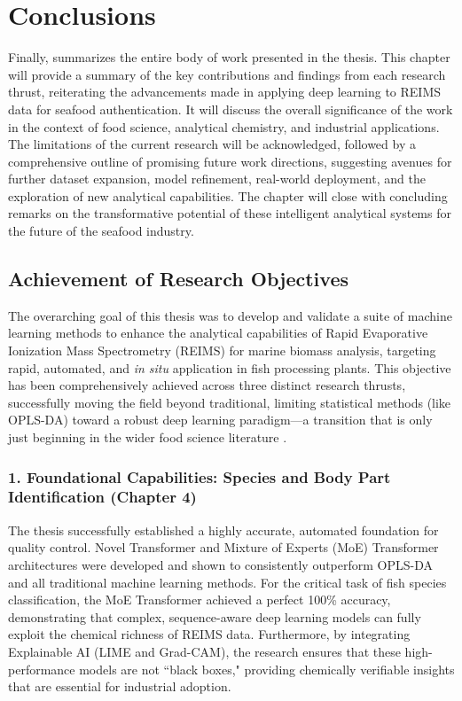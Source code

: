 \chapter{Conclusions}
\label{chapter:conclusions}

Finally,  summarizes the entire body of work presented in the thesis. This chapter will provide a summary of the key contributions and findings from each research thrust, reiterating the advancements made in applying deep learning to REIMS data for seafood authentication. It will discuss the overall significance of the work in the context of food science, analytical chemistry, and industrial applications. The limitations of the current research will be acknowledged, followed by a comprehensive outline of promising future work directions, suggesting avenues for further dataset expansion, model refinement, real-world deployment, and the exploration of new analytical capabilities. The chapter will close with concluding remarks on the transformative potential of these intelligent analytical systems for the future of the seafood industry.

\section{Achievement of Research Objectives}

The overarching goal of this thesis was to develop and validate a suite of machine learning methods to enhance the analytical capabilities of Rapid Evaporative Ionization Mass Spectrometry (REIMS) for marine biomass analysis, targeting rapid, automated, and \textit{in situ} application in fish processing plants.
This objective has been comprehensively achieved across three distinct research thrusts, successfully moving the field beyond traditional, limiting statistical methods (like OPLS-DA) toward a robust deep learning paradigm---a transition that is only just beginning in the wider food science literature \citep{Cardoso2025}.

\subsection*{1. Foundational Capabilities: Species and Body Part Identification (Chapter 4)}

The thesis successfully established a highly accurate, automated foundation for quality control. Novel Transformer and Mixture of Experts (MoE) Transformer architectures were developed and shown to consistently outperform OPLS-DA and all traditional machine learning methods. For the critical task of fish species classification, the MoE Transformer achieved a perfect 100\% accuracy, demonstrating that complex, sequence-aware deep learning models can fully exploit the chemical richness of REIMS data. Furthermore, by integrating Explainable AI (LIME and Grad-CAM), the research ensures that these high-performance models are not ``black boxes," providing chemically verifiable insights that are essential for industrial adoption.

